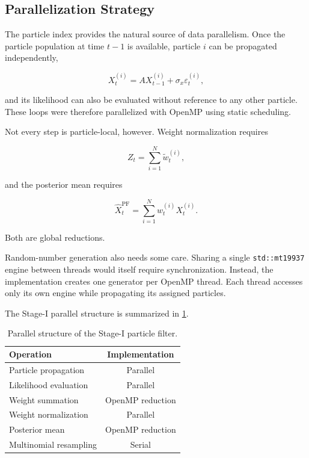 \subsection{Parallelization Strategy}
\label{subsec:stage1-openmp}

The particle index provides the natural source of data parallelism.
Once the particle population at time \(t-1\) is available, particle
\(i\) can be propagated independently,

\begin{equation}
	X_t^{(i)}
	=
	A X_{t-1}^{(i)}
	+
	\sigma_x\varepsilon_t^{(i)},
\end{equation}

and its likelihood can also be evaluated without reference to any other
particle. These loops were therefore parallelized with OpenMP using
static scheduling.

Not every step is particle-local, however. Weight normalization requires

\begin{equation}
	Z_t
	=
	\sum_{i=1}^{N}\widetilde{w}_t^{(i)},
\end{equation}

and the posterior mean requires

\begin{equation}
	\widehat{X}_t^{\mathrm{PF}}
	=
	\sum_{i=1}^{N}w_t^{(i)}X_t^{(i)}.
\end{equation}

Both are global reductions.

Random-number generation also needs some care. Sharing a single
\texttt{std::mt19937} engine between threads would itself require
synchronization. Instead, the implementation creates one generator per
OpenMP thread. Each thread accesses only its own engine while propagating
its assigned particles.

The Stage-I parallel structure is summarized in
\cref{tab:stage1-parallel-structure}.

\begin{table}[H]
	\centering
	\caption{Parallel structure of the Stage-I particle filter.}
	\label{tab:stage1-parallel-structure}
	\begin{tabular}{lc}
		\toprule
		Operation & Implementation \\
		\midrule
		Particle propagation & Parallel \\
		Likelihood evaluation & Parallel \\
		Weight summation & OpenMP reduction \\
		Weight normalization & Parallel \\
		Posterior mean & OpenMP reduction \\
		Multinomial resampling & Serial \\
		\bottomrule
	\end{tabular}
\end{table}

